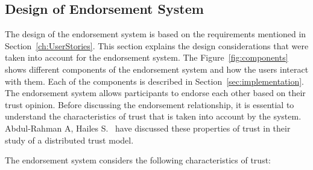 \subsection{Design of Endorsement System}
The design of the endorsement system is based on the requirements mentioned in
Section~\ref{ch:UserStories}. This section explains the design considerations
that were taken into account for the endorsement system. The
Figure~\ref{fig:components} shows different components of the endorsement
system and how the users interact with them. Each of the components is
described in Section~\ref{sec:implementation}. The endorsement system allows
participants to endorse each other based on their trust opinion. Before
discussing the endorsement relationship, it is essential to understand the
characteristics of trust that is taken into account by the system. Abdul-Rahman
A, Hailes S.~\cite{abdul1998distributed} have discussed these properties of
trust in their study of a distributed trust model. \par
The endorsement system considers the following characteristics of trust:
